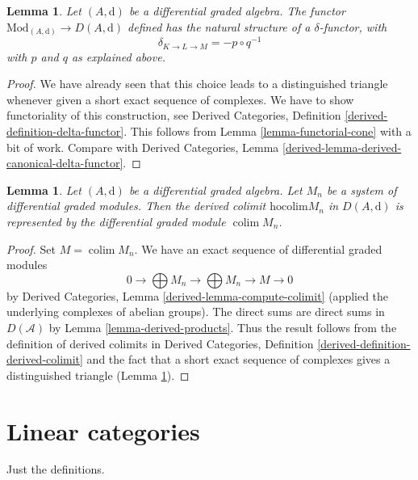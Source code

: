 \documentclass{stacks-project}
\theoremstyle{plain}
\newtheorem{lemma}[subsection]{Lemma}
\theoremstyle{definition}
\theoremstyle{remark}
\numberwithin{equation}{subsection}
\def\colim{\mathop{\mathrm{colim}}\nolimits}
\begin{document}
\begin{lemma}
\label{lemma-derived-canonical-delta-functor}
Let $(A, \text{d})$ be a differential graded algebra. The functor
$\text{Mod}_{(A, \text{d})} \to D(A, \text{d})$
defined has the natural structure of a $\delta$-functor, with
$$
\delta_{K \to L \to M} = - p \circ q^{-1}
$$
with $p$ and $q$ as explained above.
\end{lemma}

\begin{proof}
We have already seen that this choice leads to a distinguished
triangle whenever given a short exact sequence of complexes.
We have to show functoriality of this construction, see
Derived Categories, Definition \ref{derived-definition-delta-functor}.
This follows from Lemma \ref{lemma-functorial-cone} with a bit of
work. Compare with
Derived Categories, Lemma \ref{derived-lemma-derived-canonical-delta-functor}.
\end{proof}

\begin{lemma}
\label{lemma-homotopy-colimit}
Let $(A, \text{d})$ be a differential graded algebra. Let
$M_n$ be a system of differential graded modules. Then the derived
colimit $\text{hocolim} M_n$ in $D(A, \text{d})$ is represented
by the differential graded module $\colim M_n$.
\end{lemma}

\begin{proof}
Set $M = \colim M_n$. We have an exact sequence of differential graded modules
$$
0 \to \bigoplus M_n \to \bigoplus M_n \to M \to 0
$$
by Derived Categories, Lemma \ref{derived-lemma-compute-colimit}
(applied the underlying complexes of abelian groups).
The direct sums are direct sums in $D(\mathcal{A})$ by
Lemma \ref{lemma-derived-products}.
Thus the result follows from the definition
of derived colimits in Derived Categories,
Definition \ref{derived-definition-derived-colimit}
and the fact that a short exact sequence of complexes
gives a distinguished triangle
(Lemma \ref{lemma-derived-canonical-delta-functor}).
\end{proof}








\section{Linear categories}
\label{section-linear}

\noindent
Just the definitions.
\end{document}
